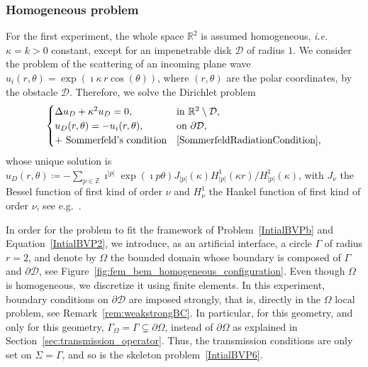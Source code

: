 \documentclass[a4paper,11pt]{article}
\begin{document}
\subsubsection{Homogeneous problem}\label{subsubsec:homogenous_fem_bem}

For the first experiment, the whole space \(\mathbb{R}^2\) is assumed
homogeneous, \textit{i.e.} \(\kappa=k > 0\) constant, except for an
impenetrable disk \(\mathcal{D}\) of radius \(1\).  We consider the problem
of the scattering of an incoming plane wave \(u_{i}(r,\theta) = \exp(\imath
  \kappa \, r \cos(\theta))\), where \((r,\theta)\) are the polar
coordinates, by the obstacle \(\mathcal{D}\). Therefore, we solve the
Dirichlet problem
\begin{equation}\label{pbm:fem-bem_dirichlet}
  \begin{cases}
    \Delta u_D + \kappa^2 u_D = 0, 
    & \text{in } \mathbb{R}^2 \setminus \mathcal{D}, \\
    u_D(r,\theta) = - u_i(r, \theta), & \text{on \(\partial \mathcal{D}\)}, \\
    +  \text{ Sommerfeld's condition} &\text{\eqref{SommerfeldRadiationCondition}}, 
  \end{cases}
\end{equation}
whose unique solution is \(u_D(r, \theta) \coloneqq -\sum_{p \in
  \mathbb{Z}} \imath^{\lvert p \rvert}\exp(\imath p \theta)
J_{\lvert p \rvert}(\kappa) H^1_{\lvert p \rvert}(\kappa
r)/H^1_{\lvert p \rvert}(\kappa ) \), with \(J_{\nu}\) the Bessel function of first kind
of order \(\nu\) and \(H^1_{\nu}\) the Hankel function of first kind of
order \(\nu\), see e.g.~\cite[Chap.10]{MR2723248}.

In order for the problem to fit the framework of Problem~\eqref{IntialBVPb} and Equation~\eqref{IntialBVP2}, we introduce, as an artificial interface, a circle \(\Gamma\) of radius \(r=2\), and denote by \(\Omega\) the bounded domain whose boundary is composed of \(\Gamma\) and \(\partial \mathcal{D}\), see Figure~\ref{fig:fem_bem_homogeneous_configuration}.
Even though \(\Omega\) is homogeneous, we discretize it using finite elements.
In this experiment, boundary conditions on \(\partial \mathcal{D}\) are imposed strongly, that is, directly in the \(\Omega\) local problem, see Remark~\ref{rem:weakstrongBC}. In particular, for this geometry, and only for this geometry, \(\Gamma_{\Omega} = \Gamma \subsetneq \partial \Omega\), instead of \(\partial \Omega\) as explained in Section~\ref{sec:transmission_operator}. Thus, the transmission conditions are only set on \(\Sigma = \Gamma\), and so is the skeleton problem~\eqref{IntialBVP6}.
\end{document}
